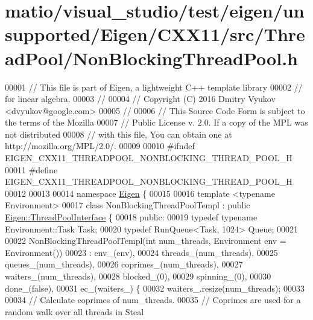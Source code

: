 \hypertarget{matio_2visual__studio_2test_2eigen_2unsupported_2_eigen_2_c_x_x11_2src_2_thread_pool_2_non_blocking_thread_pool_8h_source}{}\section{matio/visual\+\_\+studio/test/eigen/unsupported/\+Eigen/\+C\+X\+X11/src/\+Thread\+Pool/\+Non\+Blocking\+Thread\+Pool.h}
\label{matio_2visual__studio_2test_2eigen_2unsupported_2_eigen_2_c_x_x11_2src_2_thread_pool_2_non_blocking_thread_pool_8h_source}

\begin{DoxyCode}
00001 \textcolor{comment}{// This file is part of Eigen, a lightweight C++ template library}
00002 \textcolor{comment}{// for linear algebra.}
00003 \textcolor{comment}{//}
00004 \textcolor{comment}{// Copyright (C) 2016 Dmitry Vyukov <dvyukov@google.com>}
00005 \textcolor{comment}{//}
00006 \textcolor{comment}{// This Source Code Form is subject to the terms of the Mozilla}
00007 \textcolor{comment}{// Public License v. 2.0. If a copy of the MPL was not distributed}
00008 \textcolor{comment}{// with this file, You can obtain one at http://mozilla.org/MPL/2.0/.}
00009 
00010 \textcolor{preprocessor}{#ifndef EIGEN\_CXX11\_THREADPOOL\_NONBLOCKING\_THREAD\_POOL\_H}
00011 \textcolor{preprocessor}{#define EIGEN\_CXX11\_THREADPOOL\_NONBLOCKING\_THREAD\_POOL\_H}
00012 
00013 
00014 \textcolor{keyword}{namespace }\hyperlink{namespace_eigen}{Eigen} \{
00015 
00016 \textcolor{keyword}{template} <\textcolor{keyword}{typename} Environment>
00017 \textcolor{keyword}{class }NonBlockingThreadPoolTempl : \textcolor{keyword}{public} \hyperlink{class_eigen_1_1_thread_pool_interface}{Eigen::ThreadPoolInterface} \{
00018  \textcolor{keyword}{public}:
00019   \textcolor{keyword}{typedef} \textcolor{keyword}{typename} Environment::Task Task;
00020   \textcolor{keyword}{typedef} RunQueue<Task, 1024> Queue;
00021 
00022   NonBlockingThreadPoolTempl(\textcolor{keywordtype}{int} num\_threads, Environment env = Environment())
00023       : env\_(env),
00024         threads\_(num\_threads),
00025         queues\_(num\_threads),
00026         coprimes\_(num\_threads),
00027         waiters\_(num\_threads),
00028         blocked\_(0),
00029         spinning\_(0),
00030         done\_(false),
00031         ec\_(waiters\_) \{
00032     waiters\_.resize(num\_threads);
00033 
00034     \textcolor{comment}{// Calculate coprimes of num\_threads.}
00035     \textcolor{comment}{// Coprimes are used for a random walk over all threads in Steal}

\end{DoxyCode}

